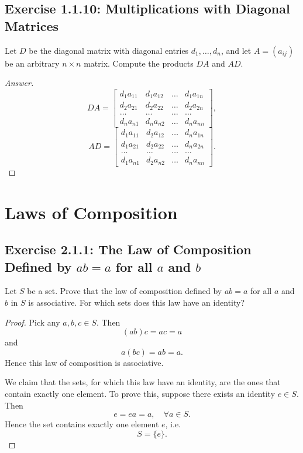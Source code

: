 \documentclass{amsbook}
\theoremstyle{definition}
\theoremstyle{remark}
\numberwithin{section}{chapter}
\numberwithin{equation}{chapter}
\begin{document}
\section{Exercise 1.1.10: Multiplications with Diagonal Matrices}
Let $D$ be the diagonal matrix with diagonal entries $d_1, \dots, d_n$, and let $A=(a_{ij})$ be an arbitrary $n\times n$ matrix. Compute the products $DA$ and $AD$.
\begin{proof}[Answer]
\[
DA=\begin{bmatrix}
d_1a_{11} & d_1a_{12} & \dots & d_1a_{1n}\\
d_2a_{21} & d_2a_{22} & \dots & d_2a_{2n}\\
\dots & \dots & \dots & \dots\\
d_na_{n1} & d_na_{n2} & \dots & d_na_{nn}
\end{bmatrix},
\]
\[
AD=\begin{bmatrix}
d_1a_{11} & d_2a_{12} & \dots & d_na_{1n}\\
d_1a_{21} & d_2a_{22} & \dots & d_na_{2n}\\
\dots & \dots & \dots & \dots\\
d_1a_{n1} & d_2a_{n2} & \dots & d_na_{nn}
\end{bmatrix}.
\]
\end{proof}

\chapter{Laws of Composition}
\section{Exercise 2.1.1: The Law of Composition Defined by $ab=a$ for all $a$ and $b$}
Let $S$ be a set. Prove that the law of composition defined by $ab=a$ for all $a$ and $b$ in $S$ is associative. For which sets does this law have an identity?
\begin{proof}
Pick any $a,b,c\in S$. Then\[
(ab)c=ac=a
\]and\[
a(bc)=ab=a.
\]Hence this law of composition is associative.

We claim that the sets, for which this law have an identity, are the ones that contain exactly one element. To prove this, suppose there exists an identity $e\in S$. Then\[
e=ea=a,\quad\forall a\in S.
\]Hence the set contains exactly one element $e$, i.e.\[
S=\{e\}.
\]
\end{proof}

\backmatter


\end{document}
